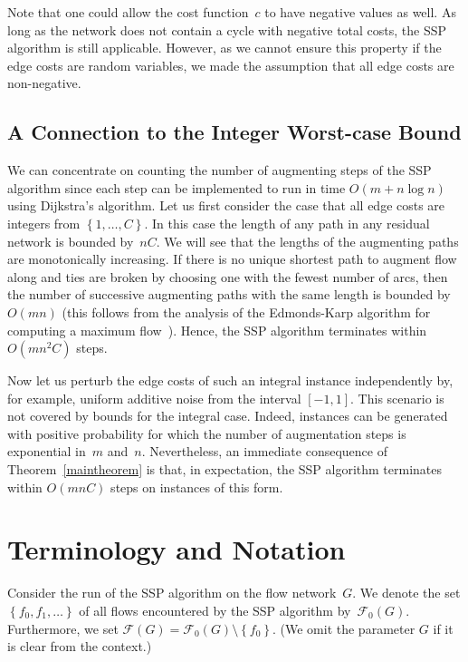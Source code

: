 \documentclass[11pt]{article}
\newcommand{\F}{\mathcal{F}}
\newcommand{\SET}[1]{\left\{#1\right\}}
\begin{document}
Note that one could allow the cost function~$c$ to have negative values as well. As long as the network does not contain a cycle with negative total costs, the SSP algorithm is still applicable. However, as we cannot ensure this property if the edge costs are random variables, we made the assumption that all edge costs are non-negative.

\subsection{A Connection to the Integer Worst-case Bound}

We can concentrate on counting the number of augmenting steps of the SSP algorithm since each step can be implemented to run in time $O(m + n \log n)$ using Dijkstra's algorithm. Let us first consider the case that all edge costs are integers from $\SET{ 1, \ldots, C }$. In this case the length of any path in any residual network is bounded by~$nC$. We will see that the lengths of the augmenting paths are monotonically increasing. If there is no unique shortest path to augment flow along and ties are broken by choosing one with the fewest number of arcs, then the number of successive augmenting paths with the same length is bounded by $O(mn)$
(this follows from the analysis of the Edmonds-Karp algorithm for computing a maximum flow~\cite{CLRS}).
 Hence, the SSP algorithm terminates within $O(mn^2C)$ steps.

Now let us perturb the edge costs of such an integral instance independently by, for example, uniform additive noise from the interval $[-1,1]$.
This scenario is not covered by bounds for the integral case. Indeed, instances can be generated with positive probability for which the number of augmentation
steps is exponential in~$m$ and~$n$. Nevertheless, an immediate consequence of Theorem~\ref{maintheorem} is that, in expectation, the SSP
algorithm terminates within $O(mnC)$ steps on instances of this form.

\section{Terminology and Notation}

Consider the run of the SSP algorithm on the flow network~$G$. We denote the set $\SET{ f_0, f_1, \ldots }$ of all flows encountered by the SSP algorithm by~$\F_0(G)$. Furthermore, we set $\F(G) = \F_0(G) \setminus \SET{ f_0 }$.
(We omit the parameter $G$ if it is clear from the context.)
\end{document}
